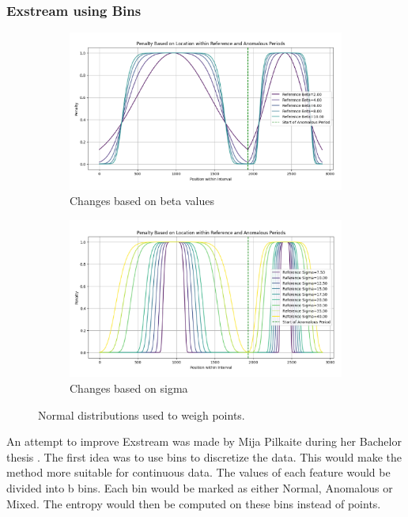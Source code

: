 \documentclass[oneside, a4paper, onecolumn, 11pt]{article}
\begin{document}
\subsubsection{Exstream using Bins}
\begin{figure}[H]
  \centering
  \begin{subfigure}{0.3\textwidth}
      \centering
      \includegraphics[width=\linewidth]{images/bin_1.png}
      \caption{Changes based on beta values}
  \end{subfigure}
  \begin{subfigure}{0.3\textwidth}
      \centering
      \includegraphics[width=\linewidth]{images/bin_2.png}
      \caption{Changes based on sigma}
  \end{subfigure}
  \caption{Normal distributions used to weigh points.}
\end{figure}
An attempt to improve Exstream was made by Mija Pilkaite during her Bachelor thesis \cite{MijaExstream}. The first idea was to use bins to discretize the data. This would make the method more suitable for continuous data. The values of each feature would be divided into b bins. Each bin would be marked as either Normal, Anomalous or Mixed. The entropy would then be computed on these bins instead of points. 
\end{document}
